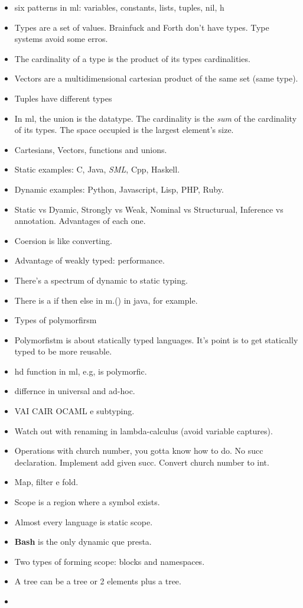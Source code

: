 \documentclass[11pt]{article}
\begin{document}
\begin{itemize}
\item six patterns in ml: variables, constants, lists, tuples, nil, h
\item Types are a set of values. Brainfuck and Forth don't have types. Type systems avoid some
erros.
\item The cardinality of a type is the product of its types cardinalities.
\item Vectors are a multidimensional cartesian product of the same set (same type).
\item Tuples have different types
\item In ml, the union is the datatype.  The cardinality is the \emph{sum} of the cardinality of
its types. The space occupied is the largest element's size.
\item Cartesians, Vectors, functions and unions.
\item Static examples: C, Java, \emph{SML}, Cpp, Haskell.
\item Dynamic examples: Python, Javascript, Lisp, PHP, Ruby.
\item Static vs Dyamic, Strongly vs Weak, Nominal vs Structurual, Inference vs annotation. Advantages of each one.
\item Coersion is like converting.
\item Advantage of weakly typed: performance.
\item There's a spectrum of dynamic to static typing.
\item There is a if then else in m.() in java, for example.
\item Types of polymorfirsm
\item Polymorfistm is about statically typed languages. It's point is to get statically typed to be more reusable.
\item hd function in ml, e.g, is polymorfic.
\item differnce in universal and ad-hoc.
\item VAI CAIR OCAML e subtyping.
\item Watch out with renaming in lambda-calculus (avoid variable captures).
\item Operations with church number, you gotta know how to do. No succ
declaration. Implement add given succ. Convert church number to int.
\item Map, filter e fold.
\item Scope is a region where a symbol exists.
\item Almost every language is static scope.
\item \textbf{Bash} is the only dynamic que presta.
\item Two types of forming scope: blocks and namespaces.
\item A tree can be a tree or 2 elements plus a tree.
\item 
\end{itemize}
\end{document}
